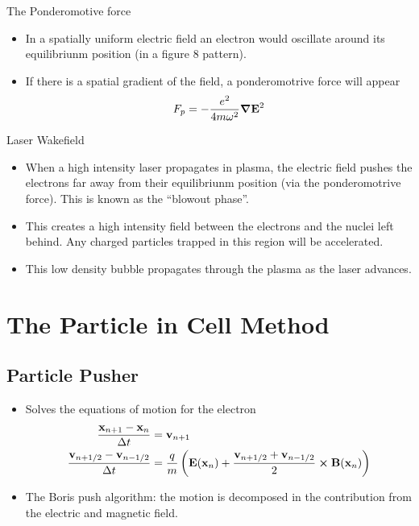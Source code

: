 \documentclass{beamer}
\begin{document}
\begin{frame}{The Ponderomotive force}
  \begin{itemize}
	\item In a spatially uniform electric field an electron would oscillate around
  	its equilibriunm position (in a figure 8 pattern).
  	\item If there is a spatial gradient of the field, a ponderomotrive force will
  	appear
  	\[
  	F_p = -\frac{e^2}{4m \omega^2} \grad{\vb{E}}^2
  	\]
	\end{itemize}
\end{frame}


\begin{frame}{Laser Wakefield}
  \begin{itemize}
    \item When a high intensity laser propagates in plasma, the
	electric field pushes the electrons far away from their equilibriunm
	position (via the ponderomotrive force). This is known as the ``blowout phase''.
	\item This creates a high intensity field between the electrons and the
	nuclei left behind. Any charged particles trapped in this region will be accelerated.
	\item This low density bubble propagates through the plasma as the laser advances.
	\end{itemize}
\end{frame}

\section{The Particle in Cell Method}

\subsection{Particle Pusher}

\begin{frame}
	\begin{itemize}
		\item Solves the equations of motion for the electron
		\begin{subequations}
		  \begin{align*}
		    \frac{\vb{x}_{n+1}-\vb{x}_n}{\Delta t} &= \vb{v}_{n+1} \\
		    \frac{\vb{v}_{n+1/2}-\vb{v}_{n-1/2}}{\Delta t} &= \frac{q}{m}
		      \left(\vb{E}(\vb{x}_n) + \frac{\vb{v}_{n+1/2}+\vb{v}_{n-1/2}}{2} \cp \vb{B}(\vb{x}_n)\right)
		  \end{align*}
		\end{subequations}
		\item The Boris push algorithm: the motion is decomposed in the contribution from the electric
		and magnetic field.
	\end{itemize}
\end{frame}
\end{document}
